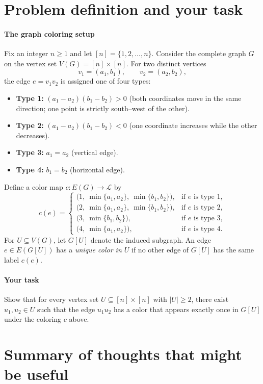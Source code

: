 \section*{Problem definition and your task}

\paragraph{The graph coloring setup}
Fix an integer $n\ge 1$ and let $[n]=\{1,2,\dots,n\}$. Consider the complete graph $G$ on the vertex set $V(G)=[n]\times [n]$. For two distinct vertices
\[
v_1=(a_1,b_1),\qquad v_2=(a_2,b_2),
\]
the edge $e=v_1v_2$ is assigned one of four types:
\begin{itemize}
  \item \textbf{Type 1:} $(a_1-a_2)(b_1-b_2)>0$ (both coordinates move in the same direction; one point is strictly south--west of the other).
  \item \textbf{Type 2:} $(a_1-a_2)(b_1-b_2)<0$ (one coordinate increases while the other decreases).
  \item \textbf{Type 3:} $a_1=a_2$ (vertical edge).
  \item \textbf{Type 4:} $b_1=b_2$ (horizontal edge).
\end{itemize}
Define a color map $c:E(G)\to \mathcal{L}$ by
\[
c(e)=
\begin{cases}
\bigl(1,\ \min\{a_1,a_2\},\ \min\{b_1,b_2\}\bigr), & \text{if $e$ is type 1},\\[2pt]
\bigl(2,\ \min\{a_1,a_2\},\ \min\{b_1,b_2\}\bigr), & \text{if $e$ is type 2},\\[2pt]
\bigl(3,\ \min\{b_1,b_2\}\bigr), & \text{if $e$ is type 3},\\[2pt]
\bigl(4,\ \min\{a_1,a_2\}\bigr), & \text{if $e$ is type 4}.
\end{cases}
\]
For $U\subseteq V(G)$, let $G[U]$ denote the induced subgraph. An edge $e\in E(G[U])$ has a \emph{unique color in $U$} if no other edge of $G[U]$ has the same label $c(e)$.

\paragraph{Your task}
Show that for every vertex set $U\subseteq [n]\times[n]$ with $|U|\ge 2$, there exist $u_1,u_2\in U$ such that the edge $u_1u_2$ has a color that appears exactly once in $G[U]$ under the coloring $c$ above.

\section*{Summary of thoughts that might be useful}

